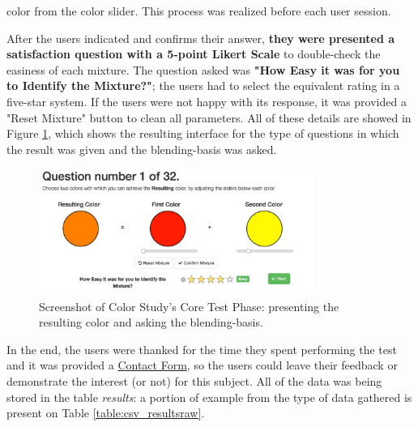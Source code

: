 color from the color slider. This process was realized before each user session. \par
%
After the users indicated and confirms their answer, \textbf{they were presented a satisfaction question with a 5-point Likert Scale} to double-check the easiness
of each mixture. The question asked was \textbf{"How Easy it was for you to Identify the Mixture?"}; the users had to select the equivalent rating in a
five-star system. If the users were not happy with its response, it was provided a "Reset Mixture" button to clean all parameters. All of these details are
showed in Figure \ref{fig:screen_core}, which shows the resulting interface for the type of questions in which the result was given and the blending-basis
was asked. \par
%
\begin{figure}[htbp]
	\centering
  \includegraphics[width=0.8\textwidth]{images/implementation/screen_core.png}
  \caption[Screenshot of Color Study's Core Test Phase: present the result and ask the blending-basis.]{Screenshot of
	Color Study's Core Test Phase: presenting the resulting color and asking the blending-basis.}
  \label{fig:screen_core}
\end{figure} \par
%
In the end, the users were thanked for the time they spent performing the test and it was provided a \ul{Contact Form}, so the users could leave their feedback or
demonstrate the interest (or not) for this subject. All of the data was being stored in the table \emph{results}: a portion of example from the type of data
gathered is present on Table \ref{table:csv_resultsraw}. \par
%
